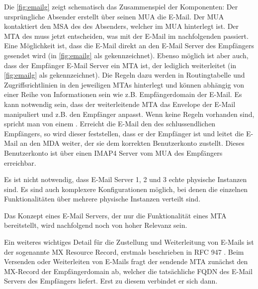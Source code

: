 \vfill
\clearpage

Die \autoref{fig:emailg} zeigt schematisch das Zusammenspiel der Komponenten:
Der ursprüngliche Absender erstellt über seinen MUA die E-Mail. Der MUA kontaktiert den MSA des  des Absenders, welcher im MUA hinterlegt ist. Der MTA des  muss jetzt entscheiden, was mit der E-Mail im nachfolgenden passiert. Eine Möglichkeit ist, dass die E-Mail direkt an den E-Mail Server des Empfängers gesendet wird (in \autoref{fig:emailg} als  gekennzeichnet). Ebenso möglich ist aber auch, dass der Empfänger E-Mail Server ein MTA ist, der lediglich weiterleitet (in \autoref{fig:emailg} als  gekennzeichnet). Die Regeln dazu werden in Routingtabelle und Zugriffsrichtlinien in den jeweiligen MTAs hinterlegt und können abhängig von einer Reihe von Informationen sein wie z.B. Empfängerdomain der E-Mail. Es kann notwendig sein, dass der weiterleitende MTA das Envelope der E-Mail manipuliert und z.B. den Empfänger anpasst. Wenn keine Regeln vorhanden sind, spricht man von einem .
Erreicht die E-Mail den  des schlussendlichen Empfängers, so wird dieser feststellen, dass er der Empfänger ist und leitet die E-Mail an den MDA weiter, der sie dem korrekten Benutzerkonto zustellt. Dieses Benutzerkonto ist über einen IMAP4 Server vom MUA des Empfängers erreichbar.

Es ist nicht notwendig, dass E-Mail Server 1, 2 und 3 echte physische Instanzen sind. Es sind auch komplexere Konfigurationen möglich, bei denen die einzelnen Funktionalitäten über mehrere physische Instanzen verteilt sind.

Das Konzept eines E-Mail Servers, der nur die Funktionalität eines MTA bereitstellt, wird nachfolgend noch von hoher Relevanz sein.

Ein weiteres wichtiges Detail für die Zustellung und Weiterleitung von E-Mails ist der sogenannte MX Resource Record, erstmals beschrieben in RFC 947 . Beim Versenden oder Weiterleiten von E-Mails fragt der sendende MTA zunächst den MX-Record der Empfängerdomain ab, welcher die tatsächliche FQDN des E-Mail Servers des Empfängers liefert. Erst zu diesem verbindet er sich dann. 

